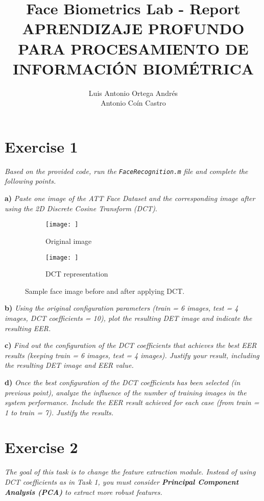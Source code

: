 \documentclass[11pt]{article}
\author{Luis Antonio Ortega Andrés\\Antonio Coín Castro}
\date{}
\title{Face Biometrics Lab - Report\\\medskip
\large APRENDIZAJE PROFUNDO PARA PROCESAMIENTO DE INFORMACIÓN BIOMÉTRICA}
\begin{document}
\maketitle

\section*{Exercise 1}

\textit{Based on the provided code, run the \texttt{FaceRecognition.m} file and complete the following points.}

\textbf{a)} \emph{Paste one image of the ATT Face Dataset and the corresponding image after using the 2D Discrete Cosine Transform (DCT)}.

\begin{figure}[h!]
  \centering
       \begin{subfigure}[t]{0.45\textwidth}
         \centering
         \texttt{[image: ]}
         \caption{Original image}
     \end{subfigure}%
     \quad
     \begin{subfigure}[t]{0.45\textwidth}
         \centering
         \texttt{[image: ]}
         \caption{DCT representation}
     \end{subfigure}
    \caption{Sample face image before and after applying DCT.}
    \label{fig:ex1a}
\end{figure}

\textbf{b)} \emph{Using the original configuration parameters (train = 6 images, test = 4 images, DCT coefficients = 10), plot the resulting DET image and indicate the resulting EER.}

\textbf{c)} \emph{Find out the configuration of the DCT coefficients that achieves the best EER results (keeping train = 6 images, test = 4 images). Justify your result, including the resulting DET image and EER value.}

\textbf{d)} \textit{Once the best configuration of the DCT coefficients has been selected (in previous point), analyze the influence of the number of training images in the system performance. Include the EER result achieved for each case (from train = 1 to train = 7). Justify the results.}

\section*{Exercise 2}

\textit{The goal of this task is to change the feature extraction module. Instead of using DCT coefficients as in Task 1, you must consider \textbf{Principal Component Analysis (PCA)} to extract more robust features.}
\end{document}

